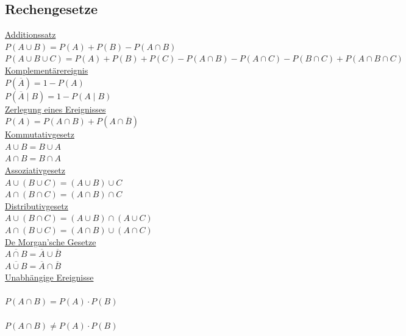 \documentclass[12pt]{article}
\begin{document}
   \noindent
   \begin{minipage}[t]{0.45\textwidth}
      \subsection*{Rechengesetze}

      \underline{Additionssatz} \\[5pt]
         \(P(A \cup B) = P(A) + P(B) - P(A \cap B)\) \\[5pt]
         \(P(A \cup B \cup C) = P(A) + P(B) + P(C) - P(A \cap B) - P(A \cap C) - P(B \cap C) + P(A \cap B \cap C)\) \\

      \underline{Komplementärereignis} \\[5pt]
         \(P(\overline{A}) = 1 - P(A)\) \\[5pt]
         \(P(\overline{A} \mid B) = 1 - P(A \mid B)\) \\

      \underline{Zerlegung eines Ereignisses} \\[5pt]
         \(P(A) = P(A \cap B) + P(A \cap \overline{B})\) \\

      \underline{Kommutativgesetz} \\[5pt]
         \(A \cup B = B \cup A\) \\[5pt]
         \(A \cap B = B \cap A\) \\

      \underline{Assoziativgesetz} \\[5pt]
         \(A \cup (B \cup C) = (A \cup B) \cup C\) \\[5pt]
         \(A \cap (B \cap C) = (A \cap B) \cap C\) \\

      \underline{Distributivgesetz} \\[5pt]
         \(A \cup (B \cap C) = (A \cup B) \cap (A \cup C)\) \\[5pt]
         \(A \cap (B \cup C) = (A \cap B) \cup (A \cap C)\) \\

      \underline{De Morgan'sche Gesetze} \\[5pt]
         \(\overline{A \cap B} = \overline{A} \cup \overline{B}\) \\[5pt]
         \(\overline{A \cup B} = \overline{A} \cap \overline{B}\) \\

      \underline{Unabhängige Ereignisse} \\[5pt]
          \\
            \(P(A \cap B) = P(A) \cdot P(B)\)  \\[5pt]
          \\[5pt]
            \(P(A \cap B) \neq P(A) \cdot P(B)\) \\
   \end{minipage}
\end{document}
